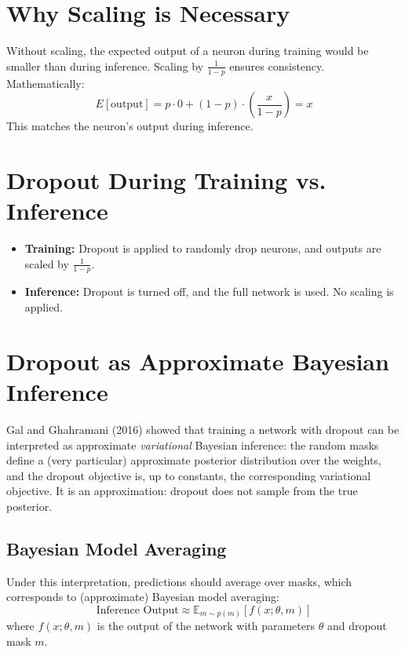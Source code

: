 \begin{notechapter}
\section{Why Scaling is Necessary}
Without scaling, the expected output of a neuron during 
training would be smaller than during inference. Scaling by 
\(\frac{1}{1-p}\) ensures consistency. Mathematically:
\[
E[\text{output}] = p \cdot 0 + (1-p) \cdot \left( \frac{x}{1-p} 
\right) = x
\]
This matches the neuron's output during inference.

\section{Dropout During Training vs. Inference}
\begin{itemize}
    \item \textbf{Training:} Dropout is applied to randomly 
    drop neurons, and outputs are scaled by \(\frac{1}{1-p}\).
    
    \item \textbf{Inference:} Dropout is turned off, and the 
    full network is used. No scaling is applied.
\end{itemize}

\section{Dropout as Approximate Bayesian Inference}
Gal and Ghahramani (2016) showed that training a network with dropout
can be interpreted as approximate \emph{variational} Bayesian inference:
the random masks define a (very particular) approximate posterior
distribution over the weights, and the dropout objective is, up to
constants, the corresponding variational objective. It is an
approximation: dropout does not sample from the true posterior.

\subsection{Bayesian Model Averaging}
Under this interpretation, predictions should average over masks,
which corresponds to (approximate) Bayesian model averaging:
\[
\text{Inference Output} \approx \mathbb{E}_{m \sim p(m)}[f(x; 
\theta, m)]
\]
where \( f(x; \theta, m) \) is the output of the network with 
parameters \( \theta \) and dropout mask \( m \).


\end{notechapter}
